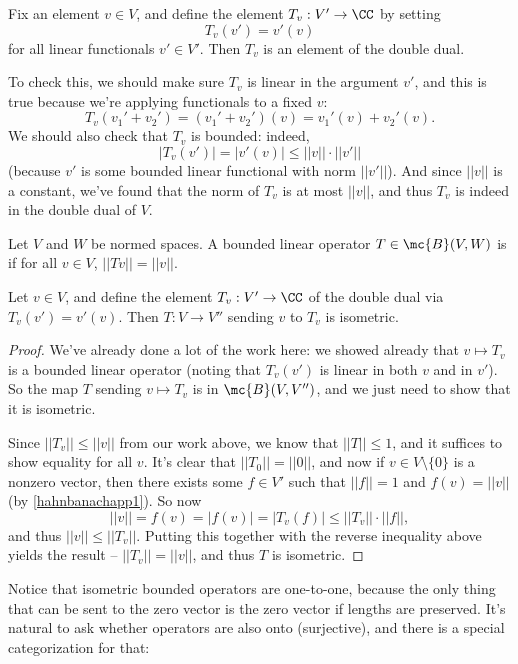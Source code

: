 \begin{example}
Fix an element $v \in V$, and define the element $T_v: V' \to \CC$ by setting 
\[
    T_v(v') = v'(v)
\]
for all linear functionals $v' \in V'$. Then $T_v$ is an element of the double dual.
\end{example}

To check this, we should make sure $T_v$ is linear in the argument $v'$, and this is true because we're applying functionals to a fixed $v$: 
\[
    T_{v}(v_1' + v_2') = (v_1' + v_2')(v) = v_1'(v) + v_2'(v).
\]
We should also check that $T_v$ is bounded: indeed, 
\[
    |T_v(v')| = |v'(v)| \le ||v|| \cdot ||v'||
\]
(because $v'$ is some bounded linear functional with norm $||v'||$). And since $||v||$ is a constant, we've found that the norm of $T_v$ is at most $||v||$, and thus $T_v$ is indeed in the double dual of $V$. 

\begin{definition}
Let $V$ and $W$ be normed spaces. A bounded linear operator $T \in \mc{B}(V, W)$ is  if for all $v \in V$, $||Tv|| = ||v||$.
\end{definition}

\begin{theorem}
Let $v \in V$, and define the element $T_v: V' \to \CC$ of the double dual via $T_v(v') = v'(v)$. Then $T: V \to V''$ sending $v$ to $T_v$ is isometric.
\end{theorem}
\begin{proof}
We've already done a lot of the work here: we showed already that $v \mapsto T_v$ is a bounded linear operator (noting that $T_v(v')$ is linear in both $v$ and in $v'$). So the map $T$ sending $v \mapsto T_v$ is in $\mc{B}(V, V'')$, and we just need to show that it is isometric. 

Since $\boxed{||T_v|| \le ||v||}$ from our work above, we know that $||T|| \le 1$, and it suffices to show equality for all $v$. It's clear that $||T_0|| = ||0||$, and now if $v \in V \setminus \{0\}$ is a nonzero vector, then there exists some $f \in V'$ such that $||f|| = 1$ and $f(v) = ||v||$ (by \cref{hahnbanachapp1}). So now 
\[
    ||v|| = f(v) = |f(v)| = |T_v(f)| \le ||T_v|| \cdot ||f||,
\]
and thus $\boxed{||v|| \le ||T_v||}$. Putting this together with the reverse inequality above yields the result -- $||T_v|| = ||v||$, and thus $T$ is isometric.
\end{proof}

Notice that isometric bounded operators are one-to-one, because the only thing that can be sent to the zero vector is the zero vector if lengths are preserved. It's natural to ask whether operators are also onto (surjective), and there is a special categorization for that:

